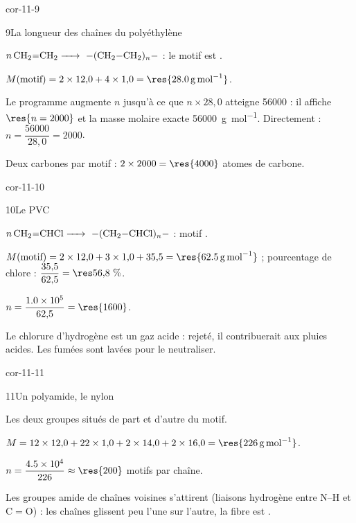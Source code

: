 \begin{blocLivre}{cor-11-9}
\begin{corrige}{9}{La longueur des chaînes du polyéthylène}
\begin{questions}
\item $n\,\ce{CH2=CH2 ->}\ \ce{-(CH2-CH2)_{$n$}-}$ : le motif est .
\item $M(\text{motif})=2\times12{,}0+4\times1{,}0=\res{\qty{28,0}{g.mol^{-1}}}$.
\item Le programme augmente $n$ jusqu'à ce que $n\times28{,}0$ atteigne \num{56000} : il affiche
$\res{n=2000}$ et la masse molaire exacte \qty{56000}{g.mol^{-1}}. Directement :
$n=\dfrac{\num{56000}}{28{,}0}=2000$.
\item Deux carbones par motif : $2\times2000=\res{4000}$ atomes de carbone.
\end{questions}
\end{corrige}
\end{blocLivre}
\begin{blocLivre}{cor-11-10}
\begin{corrige}{10}{Le PVC}
\begin{questions}
\item $n\,\ce{CH2=CHCl ->}\ \ce{-(CH2-CHCl)_{$n$}-}$ : motif .
\item $M(\text{motif})=2\times12{,}0+3\times1{,}0+35{,}5=\res{\qty{62,5}{g.mol^{-1}}}$ ; pourcentage de chlore :
$\dfrac{35{,}5}{62{,}5}=\res{56{,}8~\%}$.
\item $n=\dfrac{\num{1.0e5}}{62{,}5}=\res{1600}$.
\item Le chlorure d'hydrogène est un gaz acide : rejeté, il contribuerait aux pluies acides. Les fumées sont lavées
pour le neutraliser.
\end{questions}
\end{corrige}
\end{blocLivre}
\begin{blocLivre}{cor-11-11}
\begin{corrige}{11}{Un polyamide, le nylon}
\begin{questions}
\item Les deux groupes  situés de part et d'autre du motif.
\item $M=12\times12{,}0+22\times1{,}0+2\times14{,}0+2\times16{,}0=\res{\qty{226}{g.mol^{-1}}}$.
\item $n=\dfrac{\num{4.5e4}}{226}\approx\res{200}$ motifs par chaîne.
\item Les groupes amide de chaînes voisines s'attirent (liaisons hydrogène entre N--H et C$=$O) : les chaînes
glissent peu l'une sur l'autre, la fibre est .
\end{questions}
\end{corrige}
\end{blocLivre}
